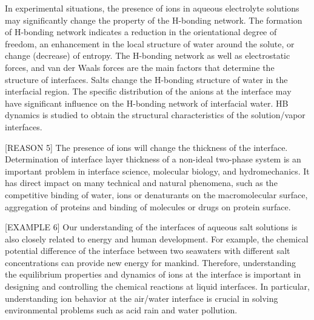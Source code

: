 In experimental situations, the presence of ions in aqueous 
electrolyte solutions may significantly change the property of the H-bonding network. 
The formation of H-bonding network indicates a reduction in the orientational degree of freedom, 
an enhancement in the local structure of water around the solute, or change (decrease) of entropy\cite{Frank45a, Frank45b,Frank45c}.
%
The H-bonding network \cite{Eisenberg1969,Speedy1976,Poole1994,Soper2008b,Nilsson2011,Ball2001,Pettersson2015} as well as electrostatic forces, 
and van der Waals forces are the main factors that determine the structure of interfaces. 
Salts change the H-bonding structure of water in the interfacial region\cite{EAR04,McLain2006,Ball2008}. 
The specific distribution of the anions at the interface may have significant influence on the H-bonding network of interfacial water\cite{Morita2008}.
HB dynamics is studied to obtain the structural characteristics of the solution/vapor interfaces.


[REASON 5]
The presence of ions will change the thickness of the interface.
Determination of interface layer thickness of a non-ideal two-phase system is an important problem in interface science, molecular biology, 
and hydromechanics.\cite{LiZhihong2001,Goharzadeh2005,Bano2006} It has direct impact on many technical and natural phenomena, 
such as the competitive binding of water, ions or denaturants on the macromolecular surface\cite{Arakawa1985,Timasheff2002}, 
aggregation of proteins\cite{Webb2001} and binding of molecules or drugs on protein surface\cite{Hritz2004}. 

[EXAMPLE 6]
Our understanding of the interfaces of aqueous salt solutions is also closely related to energy and human development. 
For example, the chemical potential difference of the interface between two seawaters with different salt concentrations can provide new energy for mankind\cite{Pattle1954,Loeb1976}. 
%
Therefore, understanding the equilibrium properties and dynamics of ions at the interface is important in designing and controlling the chemical reactions at liquid interfaces\cite{Chang06}. In particular, understanding ion behavior at the air/water interface is crucial in solving environmental problems such as acid rain and water pollution\cite{Chang06}.

